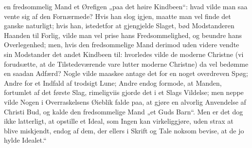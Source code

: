 \documentclass[12pt,a4paper]{book}
\begin{document}
en fredsommelig Mand et Ørefigen „paa det høire Kindbeen“: hvad vilde man saa vente sig af
den Fornærmede? Hvis han slog igjen, maatte man vel finde det ganske naturligt; hvis han,
istedetfor at gjengjelde Slaget, bød Modstanderen Haanden til Forlig, vilde man vel prise
hans Fredsommelighed, og beundre hans Overlegenhed; men, hvis den fredsommelige Mand
derimod uden videre vendte sin Modstander det andet Kindbeen til: hvorledes vilde de
moderne Christne (vi forudsætte, at de Tilstedeværende vare lutter moderne Christne) da vel
bedømme en saadan Adfærd? Nogle vilde maaskee antage det for en noget overdreven Spøg;
Andre for et Indfald af trodsigt Lune; Andre endog formode, at Manden, fortumlet af det
første Slag, rimeligviis gjorde det i et Slags Vildelse; men neppe vilde Nogen i
Overraskelsens Øieblik falde paa, at gjøre en alvorlig Anvendelse af Christi Bud, og kalde
den fredsommelige Mand „et Guds Barn“. Men er det dog ikke latterligt, at opstille et Ideal,
som Ingen kan virkeliggjøre, uden strax at blive miskjendt, endog af dem, der ellers i
Skrift og Tale noksom bevise, at de jo hylde Idealet.“
\end{document}
